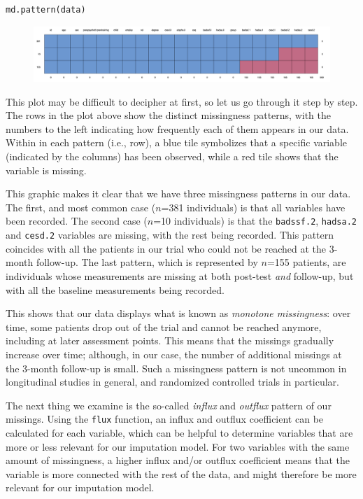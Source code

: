 \begin{lstlisting}
md.pattern(data)
\end{lstlisting}

\begin{figure}[H]
\includegraphics[width=13cm]{images/mdpattern.png}
\centering
\end{figure}

This plot may be difficult to decipher at first, so let us go through it step by step. The rows in the plot above show the distinct missingness patterns, with the numbers to the left indicating how frequently each of them appears in our data. Within in each pattern (i.e., row), a blue tile symbolizes that a specific variable (indicated by the columns) has been observed, while a red tile shows that the variable is missing.

This graphic makes it clear that we have three missingness patterns in our data. The first, and most common case ($n$=381 individuals) is that all variables have been recorded. The second case ($n$=10 individuals) is that the \texttt{badssf.2}, \texttt{hadsa.2} and \texttt{cesd.2} variables are missing, with the rest being recorded. This pattern coincides with all the patients in our trial who could not be reached at the 3-month follow-up. The last pattern, which is represented by $n$=155 patients, are individuals whose measurements are missing at both post-test \emph{and} follow-up, but with all the baseline measurements being recorded. 

This shows that our data displays what is known as \emph{monotone missingness}: over time, some patients drop out of the trial and cannot be reached anymore, including at later assessment points. This means that the missings gradually increase over time; although, in our case, the number of additional missings at the 3-month follow-up is small. Such a missingness pattern is not uncommon in longitudinal studies in general, and randomized controlled trials in particular.

The next thing we examine is the so-called \emph{influx} and \emph{outflux} pattern of our missings. Using the \texttt{flux} function, an influx and outflux coefficient can be calculated for each variable, which can be helpful to determine variables that are more or less relevant for our imputation model. For two variables with the same amount of missingness, a higher influx and/or outflux coefficient means that the variable is more connected with the rest of the data, and might therefore be more relevant for our imputation model. 

